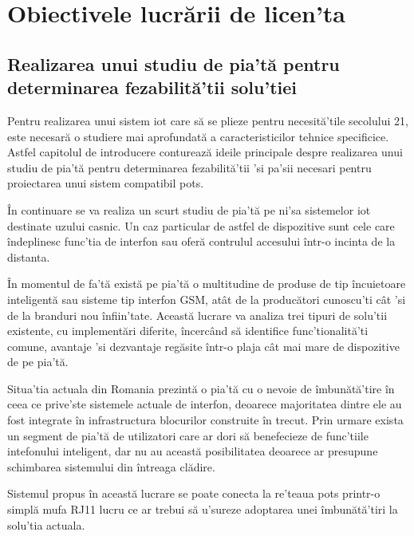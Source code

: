 \section {Obiectivele lucrării de licen'ta}

\subsection {Realizarea unui studiu de pia'tă pentru determinarea fezabilită'tii solu'tiei}

Pentru realizarea unui sistem \acrfull{iot} care să se plieze pentru necesită'tile secolului 21, este necesară o studiere mai aprofundată a caracteristicilor tehnice specificice. Astfel capitolul de introducere conturează ideile principale despre realizarea unui studiu de pia'tă pentru determinarea fezabilită'tii 'si pa'sii necesari pentru proiectarea unui sistem compatibil \acrshort{pots}.

În continuare se va realiza un scurt studiu de pia'tă pe ni'sa sistemelor \acrshort{iot} destinate uzului casnic. Un caz particular de astfel de dispozitive sunt cele care îndeplinesc func'tia de interfon sau oferă contrulul accesului într-o incinta de la distanta.

În momentul de fa'tă există pe pia'tă o multitudine de produse de tip încuietoare inteligentă sau sisteme tip interfon GSM, atât de la producători cunoscu'ti cât 'si de la branduri nou înfiin'tate. Această lucrare va analiza trei tipuri de solu'tii existente, cu implementări diferite, încercând să identifice func'tionalită'ti comune, avantaje 'si dezvantaje regăsite într-o plaja cât mai mare de dispozitive de pe pia'tă.

Situa'tia actuala din Romania prezintă o pia'tă cu o nevoie de îmbunătă'tire în ceea ce prive'ste sistemele actuale de interfon, deoarece majoritatea dintre ele au fost integrate în infrastructura blocurilor construite în trecut. Prin urmare exista un segment de pia'tă de utilizatori care ar dori să benefecieze de func'tiile intefonului inteligent, dar nu au această posibilitatea deoarece ar presupune schimbarea sistemului din întreaga clădire.



Sistemul propus în această lucrare se poate conecta la re'teaua \acrfull{pots} printr-o simplă mufa RJ11 lucru ce ar trebui să u'sureze adoptarea unei îmbunătă'tiri la solu'tia actuala.



